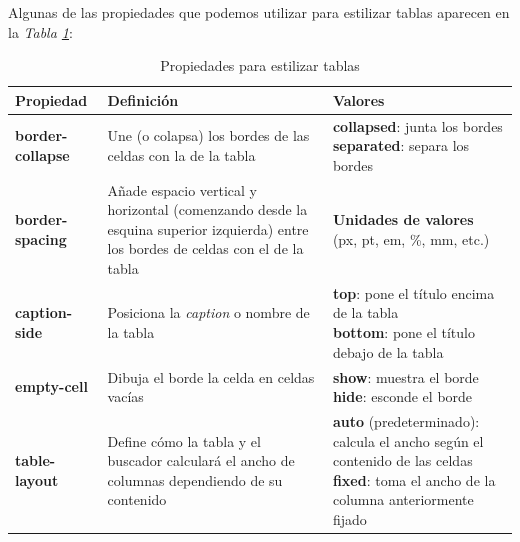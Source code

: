 Algunas de las propiedades que podemos utilizar para estilizar tablas aparecen en la \textit{Tabla \ref{tab: 3}}:
\begin{table}[H]
    \centering
    \caption{Propiedades para estilizar tablas}
    \label{tab: 3}
    \begin{tabular}{m{3cm} m{5cm} m{5cm}}
        \hline
        \textbf{Propiedad} & \textbf{Definición} & \textbf{Valores} \\
        \hline
        \parbox{3cm}{\textbf{border-collapse}}    & Une (o colapsa) los bordes de las celdas con la de la tabla   & \parbox{4.5cm}{ \textbf{collapsed}: junta los bordes \\ \textbf{separated}: separa los bordes } \\
        \parbox{3cm}{\textbf{border-spacing}}     & Añade espacio vertical y horizontal (comenzando desde la esquina superior izquierda) entre los bordes de celdas con el de la tabla    & \parbox{4.5cm}{ \textbf{Unidades de valores} \\ (px, pt, em, \%, mm, etc.) } \\
        \parbox{3cm}{\textbf{caption-side}}       & Posiciona la \textit{caption} o nombre de la tabla            & \parbox{4.5cm}{ \textbf{top}: pone el título encima de la tabla \\ \textbf{bottom}: pone el título debajo de la tabla } \\
        \parbox{3cm}{\textbf{empty-cell}}         & Dibuja el borde la celda en celdas vacías                     & \parbox{4.5cm}{\textbf{show}: muestra el borde \\ \textbf{hide}: esconde el borde } \\
        \parbox{3cm}{\textbf{table-layout}}       & Define cómo la tabla y el buscador calculará el ancho de columnas dependiendo de su contenido                                         & \parbox{4.5cm}{ \textbf{auto} (predeterminado): calcula el ancho según el contenido de las celdas \\ \textbf{fixed}: toma el ancho de la columna anteriormente fijado } \\
        \hline
    \end{tabular}
\end{table}

